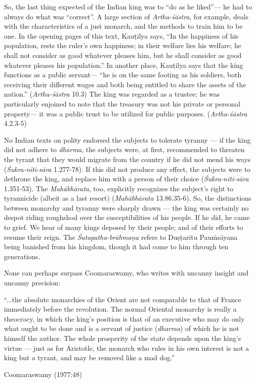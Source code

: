 So, the last thing expected of the Indian king was to “do as he liked”--- he had to always do what was “correct”. A large section of {\sl Artha-śāstra}, for example, deals with the characteristics of a just monarch, and the methods to train him to be one. In the opening pages of this text, Kauṭilya says, “In the happiness of his population, rests the ruler’s own happiness; in their welfare lies his welfare; he shall not consider as good whatever pleases him, but he shall consider as good whatever pleases his population.” In another place, Kauṭilya says that the king functions as a public servant--- “he is on the same footing as his soldiers, both receiving their different wages and both being entitled to share the assets of the nation.” ({\sl Artha-śāstra} 10.3) The king was regarded as a trustee; he was particularly enjoined to note that the treasury was not his private or personal property--- it was a public trust to be utilized for public purposes. ({\sl Artha-śāstra} 4.2.3-5)

No Indian texts on polity endorsed the subjects to tolerate tyranny --- if the king did not adhere to {\sl dharma}, the subjects were, at first, recommended to threaten the tyrant that they would migrate from the country if he did not mend his ways ({\sl Śukra-nīti-sāra} 1.277-78). If this did not produce any effect, the subjects were to dethrone the king, and replace him with a person of their choice ({\sl Śukra-nīti-sāra} 1.351-53). The {\sl Mahābhārata}, too, explicitly recognizes the subject’s right to tyrannicide (albeit as a last resort) ({\sl Mahābhārata} 13.86.35-6). So, the distinctions between monarchy and tyranny were sharply drawn --- the king was certainly no despot riding roughshod over the susceptibilities of his people. If he did, he came to grief. We hear of many kings deposed by their people; and of their efforts to resume their reign.  The {\sl Śatapatha-brāhmaṇa} refers to Duṣṭarītu Pauṁsāyana being banished from his kingdom, though it had come to him through ten generations. 

None can perhaps surpass Coomaraswamy, who writes with uncanny insight and uncanny precision: 

\begin{myquote}
“...the absolute monarchies of the Orient are not comparable to that of France immediately before the revolution. The normal Oriental monarchy is really a theocracy, in which the king’s position is that of an executive who may do only what ought to be done and is a servant of justice ({\sl dharma}) of which he is not himself the author. The whole prosperity of the state depends upon the king’s virtue --- just as for Aristotle, the monarch who rules in his own interest is not a king but a tyrant, and may be removed like a mad dog.”

\hfill Coomaraswamy (1977:48)
\end{myquote}

